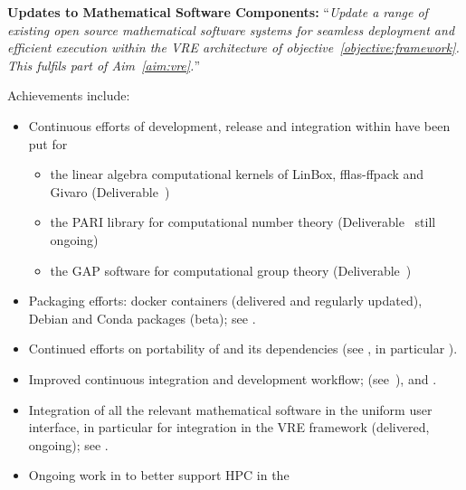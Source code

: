 \begin{compactenum}[\bf {Obj} 1\rm]

\item \label{objective:updates}
  \textbf{Updates to Mathematical Software Components:}
  ``\emph{Update a range of existing open source
  mathematical software systems for seamless deployment and efficient
  execution within the VRE architecture of objective~\ref{objective:framework}.
  This fulfils part of Aim~\ref{aim:vre}.}''


  Achievements include:
  \begin{itemize}
  \item Continuous efforts of development, release and integration within \Sage
    have been put for
    \begin{itemize}
    \item  the linear algebra computational kernels of LinBox,
      fflas-ffpack and Givaro (Deliverable~)
    \item the PARI library for computational number theory
      (Deliverable~ still ongoing)
    \item the GAP software for computational group theory
      (Deliverable~)
    \end{itemize}
  \item Packaging efforts: docker containers (delivered and regularly
    updated), Debian and Conda packages (beta); see
    .
  \item Continued efforts on portability of \Sage and its dependencies
    (see , in
    particular ).
  \item Improved continuous integration and development workflow;
    (see~), and
    .
  \item Integration of all the relevant mathematical software in the
    uniform \Jupyter user interface, in particular for integration in
    the VRE framework (delivered, ongoing); see
    .
  \item Ongoing work in  to better support HPC in the

\end{itemize}
\end{compactenum}
